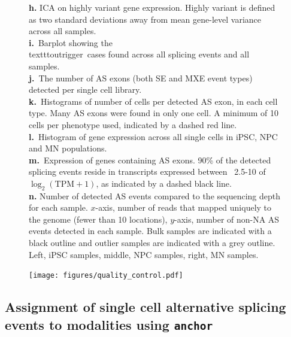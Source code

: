\begin{figure}[h]
{\textbf{h.} ICA on highly variant gene expression. Highly variant is defined as two standard deviations away from mean gene-level variance across all samples.\\
\textbf{i.}~Barplot showing the \\texttt{outrigger}\, cases found across all splicing events and all samples.\\
\textbf{j.}~The number of AS exons (both SE and MXE event types) detected per single cell library. \\
\textbf{k.}~Histograms of number of cells per detected AS exon, in each cell type. Many AS exons were found in only one cell. A minimum of 10 cells per phenotype used, indicated by a dashed red line.\\
\textbf{l.}~Histogram of gene expression across all single cells in iPSC, NPC and MN populations.\\
\textbf{m.}~Expression of genes containing AS exons. 90\% of the detected splicing events reside in transcripts expressed between ~2.5-10 of $\log_2(\mathrm{TPM}+1)$, as indicated by a dashed black line. \\
\textbf{n.} Number of detected AS events compared to the sequencing depth for each sample. $x$-axis, number of reads that mapped uniquely to the genome (fewer than 10 locations), $y$-axis, number of non-NA AS events detected in each sample. Bulk samples are indicated with a black outline and outlier samples are indicated with a grey outline. Left, iPSC samples, middle, NPC samples, right, MN samples.
}
\label{fig:quality_control}
\end{figure}
\clearpage
\begin{figure}[h]
\ContinuedFloat
\captionsetup{labelformat=empty}
\centering
\texttt{[image: figures/quality\_control.pdf]}
\end{figure}
\addtocounter{figure}{1}
\clearpage

\subsection{Assignment of single cell alternative splicing events to modalities using \texttt{anchor}}

